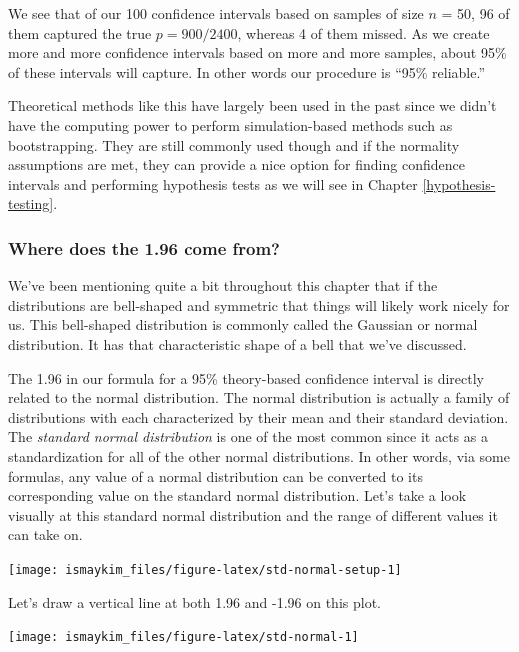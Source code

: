 \documentclass[12pt, krantz2,]{krantz}
\begin{document}
We see that of our 100 confidence intervals based on samples of size \(n\) = 50, 96 of them captured the true \(p = 900/2400\), whereas 4 of them missed. As we create more and more confidence intervals based on more and more samples, about 95\% of these intervals will capture. In other words our procedure is ``95\% reliable.''

Theoretical methods like this have largely been used in the past since we didn't have the computing power to perform simulation-based methods such as bootstrapping. They are still commonly used though and if the normality assumptions are met, they can provide a nice option for finding confidence intervals and performing hypothesis tests as we will see in Chapter \ref{hypothesis-testing}.

\hypertarget{where-does-the-1.96-come-from}{%
\subsubsection*{Where does the 1.96 come from?}\label{where-does-the-1.96-come-from}}


We've been mentioning quite a bit throughout this chapter that if the distributions are bell-shaped and symmetric that things will likely work nicely for us. This bell-shaped distribution is commonly called the Gaussian or normal distribution. It has that characteristic shape of a bell that we've discussed.

The 1.96 in our formula for a 95\% theory-based confidence interval is directly related to the normal distribution. The normal distribution is actually a family of distributions with each characterized by their mean and their standard deviation. The \emph{standard normal distribution} is one of the most common since it acts as a standardization for all of the other normal distributions. In other words, via some formulas, any value of a normal distribution can be converted to its corresponding value on the standard normal distribution. Let's take a look visually at this standard normal distribution and the range of different values it can take on.

\begin{center}\texttt{[image: ismaykim\_files/figure-latex/std-normal-setup-1]} \end{center}

Let's draw a vertical line at both 1.96 and -1.96 on this plot.

\begin{center}\texttt{[image: ismaykim\_files/figure-latex/std-normal-1]} \end{center}
\end{document}
